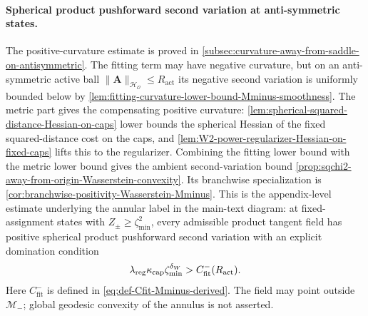 \paragraph{Spherical product pushforward second variation at anti-symmetric states.}
The positive-curvature estimate is proved in
\cref{subsec:curvature-away-from-saddle-on-antisymmetric}.  The fitting term may
have negative curvature, but on an anti-symmetric active ball
\(\|\mathbf A\|_{\mathcal H_{\mathcal O}}\le R_{\mathrm{act}}\) its negative
second variation is uniformly bounded below by
\cref{lem:fitting-curvature-lower-bound-Mminus-smoothness}.  The metric part gives
the compensating positive curvature: \cref{lem:spherical-squared-distance-Hessian-on-caps}
lower bounds the spherical Hessian of the fixed squared-distance cost on the caps,
and \cref{lem:W2-power-regularizer-Hessian-on-fixed-caps} lifts this to the
regularizer.  Combining the fitting lower bound with the metric lower bound gives
the ambient second-variation bound
\cref{prop:sqchi2-away-from-origin-Wasserstein-convexity}.  Its branchwise
specialization is \cref{cor:branchwise-positivity-Wasserstein-Mminus}.  This is the
appendix-level estimate underlying the annular label in the main-text diagram:
at fixed-assignment states with \(Z_\pm\ge\zeta_{\min}^2\), every admissible
product tangent field has positive spherical product pushforward second variation
with an explicit domination condition
\[
    \lambda_{\mathrm{reg}}\kappa_{\mathrm{cap}}\zeta_{\min}^{\delta_W}
    >
    C_{\mathrm{fit}}^-(R_{\mathrm{act}}) .
\]
Here \(C_{\mathrm{fit}}^-\) is defined in
\eqref{eq:def-Cfit-Mminus-derived}. The field may point outside
\(\mathcal M_-\); global geodesic convexity of the annulus is not asserted.

